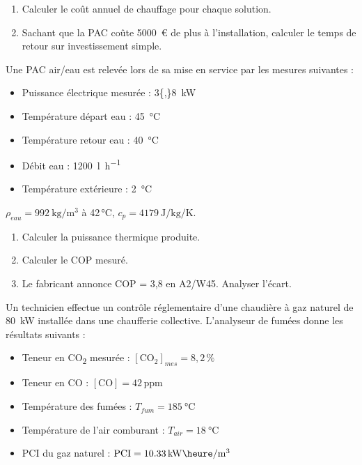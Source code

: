 \begin{enumerate}
  \item Calculer le coût annuel de chauffage pour chaque solution.
  \item Sachant que la PAC coûte \SI{5000}{\euro} de plus à l'installation, calculer le temps de retour sur investissement simple.
\end{enumerate}



Une PAC air/eau est relevée lors de sa mise en service par les mesures suivantes :
\begin{itemize}
  \item Puissance électrique mesurée : \SI{3{,}8}{\kilo\watt}
  \item Température départ eau : \SI{45}{\celsius}
  \item Température retour eau : \SI{40}{\celsius}
  \item Débit eau : \SI{1200}{\litre\per\hour}
  \item Température extérieure : \SI{2}{\celsius}
\end{itemize}
$\rho_{eau} = \SI{992}{\kilogram\per\cubic\metre}$ à 42\,°C, $c_p = \SI{4179}{\joule\per\kilogram\per\kelvin}$.

\begin{enumerate}
  \item Calculer la puissance thermique produite.
  \item Calculer le COP mesuré.
  \item Le fabricant annonce COP = 3,8 en A2/W45. Analyser l'écart.
\end{enumerate}



Un technicien effectue un contrôle réglementaire d'une chaudière à gaz naturel de \SI{80}{\kilo\watt} installée dans une chaufferie collective. L'analyseur de fumées donne les résultats suivants :
\begin{itemize}
  \item Teneur en CO\textsubscript{2} mesurée : $[\text{CO}_2]_{mes} = 8{,}2\,\%$
  \item Teneur en CO : $[\text{CO}] = 42\,\text{ppm}$
  \item Température des fumées : $T_{fum} = \SI{185}{\celsius}$
  \item Température de l'air comburant : $T_{air} = \SI{18}{\celsius}$
  \item PCI du gaz naturel : $\text{PCI} = \SI{10{,}33}{\kilo\watt\heure\per\cubic\metre}$
\end{itemize}

